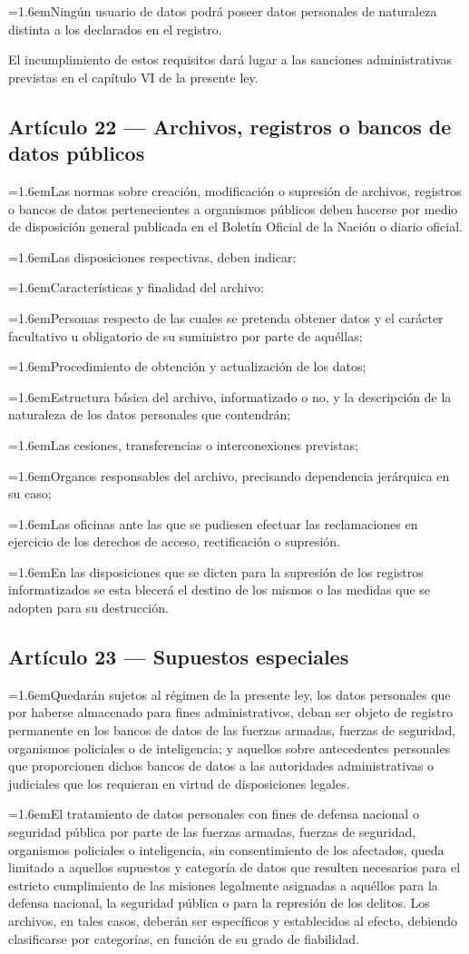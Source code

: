 \documentclass[10pt,a4paper]{article}
\newcommand{\articulo}[1]{\subsection{#1}}
\newcommand{\inciso}[2]{\par{\hangindent=1.6em\hangafter=1\makebox[1.6em][l]{#1}#2\par}}
\begin{document}
\inciso{3)}{Ningún usuario de datos podrá poseer datos personales de naturaleza distinta a los declarados en el registro.}

El incumplimiento de estos requisitos dará lugar a las sanciones administrativas previstas en el capítulo VI de la presente ley.

\articulo{Artículo 22 --- Archivos, registros o bancos de datos públicos}
\inciso{1.}{Las normas sobre creación, modificación o supresión de archivos, registros o bancos de datos pertenecientes a organismos públicos deben hacerse por medio de disposición general publicada en el Boletín Oficial de la Nación o diario oficial.}

\inciso{2.}{Las disposiciones respectivas, deben indicar:}

\inciso{a)}{Características y finalidad del archivo;}

\inciso{b)}{Personas respecto de las cuales se pretenda obtener datos y el carácter facultativo u obligatorio de su suministro por parte de aquéllas;}

\inciso{c)}{Procedimiento de obtención y actualización de los datos;}

\inciso{d)}{Estructura básica del archivo, informatizado o no, y la descripción de la naturaleza de los datos personales que contendrán;}

\inciso{e)}{Las cesiones, transferencias o interconexiones previstas;}

\inciso{f)}{Organos responsables del archivo, precisando dependencia jerárquica en su caso;}

\inciso{g)}{Las oficinas ante las que se pudiesen efectuar las reclamaciones en ejercicio de los derechos de acceso, rectificación o supresión.}

\inciso{3.}{En las disposiciones que se dicten para la supresión de los registros informatizados se esta blecerá el destino de los mismos o las medidas que se adopten para su destrucción.}

\articulo{Artículo 23 --- Supuestos especiales}
\inciso{1.}{Quedarán sujetos al régimen de la presente ley, los datos personales que por haberse almacenado para fines administrativos, deban ser objeto de registro permanente en los bancos de datos de las fuerzas armadas, fuerzas de seguridad, organismos policiales o de inteligencia; y aquellos sobre antecedentes personales que proporcionen dichos bancos de datos a las autoridades administrativas o judiciales que los requieran en virtud de disposiciones legales.}

\inciso{2.}{El tratamiento de datos personales con fines de defensa nacional o seguridad pública por parte de las fuerzas armadas, fuerzas de seguridad, organismos policiales o inteligencia, sin consentimiento de los afectados, queda limitado a aquellos supuestos y categoría de datos que resulten necesarios para el estricto cumplimiento de las misiones legalmente asignadas a aquéllos para la defensa nacional, la seguridad pública o para la represión de los delitos. Los archivos, en tales casos, deberán ser específicos y establecidos al efecto, debiendo clasificarse por categorías, en función de su grado de fiabilidad.}
\end{document}
